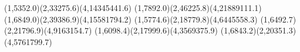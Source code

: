 {(1,5352.0)(2,33275.6)(4,14345441.6)}
{(1,7892.0)(2,46225.8)(4,21889111.1)}
{(1,6849.0)(2,39386.9)(4,15581794.2)}
{(1,5774.6)(2,18779.8)(4,6445558.3)}
{(1,6492.7)(2,21796.9)(4,9163154.7)}
{(1,6098.4)(2,17999.6)(4,3569375.9)}
{(1,6843.2)(2,20351.3)(4,5761799.7)}